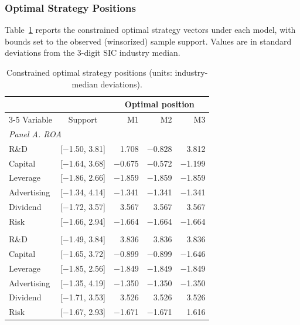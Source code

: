 \documentclass[12pt]{article}
\begin{document}
\subsubsection{Optimal Strategy Positions}

Table~\ref{tab:optimal_positions} reports the constrained optimal strategy vectors under each model, with bounds set to the observed (winsorized) sample support. Values are in standard deviations from the 3-digit SIC industry median.

\begin{table}[htbp]
\centering
\caption{Constrained optimal strategy positions (units: industry-median deviations).}
\label{tab:optimal_positions}
\begin{tabular}{l@{\hskip 6pt}c@{\hskip 8pt}r@{\hskip 8pt}r@{\hskip 8pt}r}
\toprule
 & & \multicolumn{3}{c}{Optimal position} \\
\cmidrule(lr){3-5}
Variable & Support & M1 & M2 & M3 \\
\midrule
\multicolumn{5}{l}{\textit{Panel A. ROA}} \\
\addlinespace
R\&D       & [$-$1.50, 3.81] &   1.708 & $-$0.828 &   3.812 \\
Capital    & [$-$1.64, 3.68] & $-$0.675 & $-$0.572 & $-$1.199 \\
Leverage   & [$-$1.86, 2.66] & $-$1.859 & $-$1.859 & $-$1.859 \\
Advertising& [$-$1.34, 4.14] & $-$1.341 & $-$1.341 & $-$1.341 \\
Dividend   & [$-$1.72, 3.57] &   3.567 &   3.567 &   3.567 \\
Risk       & [$-$1.66, 2.94] & $-$1.664 & $-$1.664 & $-$1.664 \\
\addlinespace
\multicolumn{5}{l}{\textit{Panel B. Tobin's Q}} \\
\addlinespace
R\&D       & [$-$1.49, 3.84] &   3.836 &   3.836 &   3.836 \\
Capital    & [$-$1.65, 3.72] & $-$0.899 & $-$0.899 & $-$1.646 \\
Leverage   & [$-$1.85, 2.56] & $-$1.849 & $-$1.849 & $-$1.849 \\
Advertising& [$-$1.35, 4.19] & $-$1.350 & $-$1.350 & $-$1.350 \\
Dividend   & [$-$1.71, 3.53] &   3.526 &   3.526 &   3.526 \\
Risk       & [$-$1.67, 2.93] & $-$1.671 & $-$1.671 &   1.616 \\
\bottomrule
\end{tabular}
\end{table}
\end{document}

